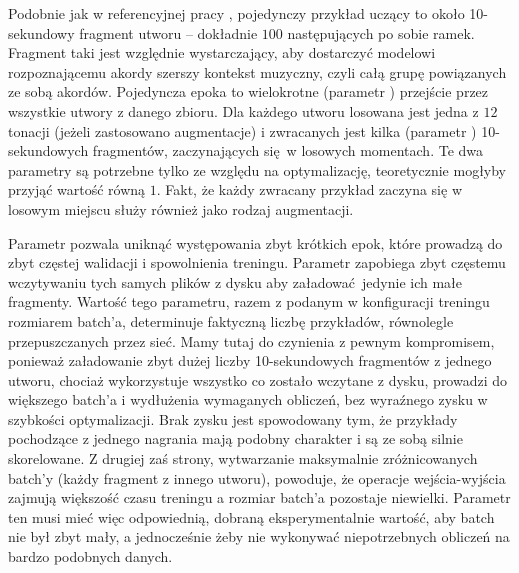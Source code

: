 Podobnie jak w referencyjnej pracy \cite{park_bi-directional_2019}, pojedynczy przykład uczący to około 10-sekundowy fragment utworu -- dokładnie $100$ następujących po sobie ramek. Fragment taki jest względnie wystarczający, aby dostarczyć modelowi rozpoznającemu akordy szerszy kontekst muzyczny, czyli całą grupę powiązanych ze sobą akordów. Pojedyncza epoka to wielokrotne (parametr ) przejście przez wszystkie utwory z danego zbioru. Dla każdego utworu losowana jest jedna z $12$ tonacji (jeżeli zastosowano augmentacje) i zwracanych jest kilka (parametr ) 10-sekundowych fragmentów, zaczynających się w losowych momentach. Te dwa parametry są potrzebne tylko ze względu na optymalizację, teoretycznie mogłyby przyjąć wartość równą $1$. Fakt, że każdy zwracany przykład zaczyna się w losowym miejscu służy również jako rodzaj augmentacji.

Parametr  pozwala uniknąć występowania zbyt krótkich epok, które prowadzą do zbyt częstej walidacji i spowolnienia treningu. Parametr  zapobiega zbyt częstemu wczytywaniu tych samych plików z dysku aby załadować jedynie ich małe fragmenty. Wartość tego parametru, razem z podanym w konfiguracji treningu rozmiarem batch'a, determinuje faktyczną liczbę przykładów, równolegle przepuszczanych przez sieć. Mamy tutaj do czynienia z pewnym kompromisem, ponieważ załadowanie zbyt dużej liczby 10-sekundowych fragmentów z jednego utworu, chociaż wykorzystuje wszystko co zostało wczytane z dysku, prowadzi do większego batch'a i wydłużenia wymaganych obliczeń, bez wyraźnego zysku w szybkości optymalizacji. Brak zysku jest spowodowany tym, że przykłady pochodzące z jednego nagrania mają podobny charakter i są ze sobą silnie skorelowane. Z drugiej zaś strony, wytwarzanie maksymalnie zróżnicowanych batch'y (każdy fragment z innego utworu), powoduje, że operacje wejścia-wyjścia zajmują większość czasu treningu a rozmiar batch'a pozostaje niewielki.  Parametr ten musi mieć więc odpowiednią, dobraną eksperymentalnie wartość, aby batch nie był zbyt mały, a jednocześnie żeby nie wykonywać niepotrzebnych obliczeń na bardzo podobnych danych.

